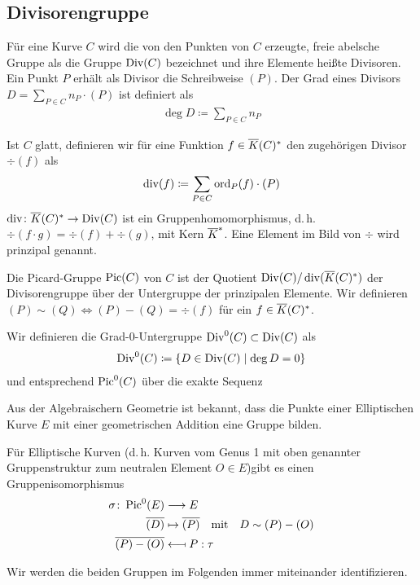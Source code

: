 \subsection{Divisorengruppe}
\begin{Definition}[Divisorengruppe]
  Für eine Kurve $C$ wird die von den Punkten von $C$ erzeugte, freie
  abelsche Gruppe als die Gruppe $\operatorname{Div}(C)$ bezeichnet und ihre
  Elemente heißte Divisoren. Ein Punkt $P$ erhält als Divisor die
  Schreibweise $(P)$. 
  Der Grad eines Divisors $D=\sum_{P\in C}n_P\cdot(P)$ ist definiert als
  \begin{gather*}
    \deg D \coloneqq \sum_{P\in C} n_P
  \end{gather*}
  
  Ist $C$ glatt, definieren wir für eine Funktion
  $f\in\overline K(C)^*$ den zugehörigen Divisor $\div(f)$
  als
  \begin{gather*}
    \operatorname{div}(f) \coloneqq \sum_{P\in C}\operatorname{ord}_P(f)\cdot(P)
  \end{gather*}
  $\operatorname{div}\colon\overline K(C)^*\to\operatorname{Div}(C)$ ist ein Gruppenhomomorphismus,
  d.\,h. $\div(f\cdot g)=\div(f)+\div(g)$,
  mit Kern $\overline K^*$.
  Eine Element im Bild von $\div$ wird prinzipal genannt.
  
  Die Picard-Gruppe $\operatorname{Pic}(C)$ von $C$ ist der Quotient
  $\operatorname{Div}(C)/\operatorname{div}(\overline K(C)^*)$ der Divisorengruppe über der Untergruppe
  der prinzipalen Elemente. Wir definieren 
  $(P)\sim(Q)\Leftrightarrow (P)-(Q)=\div(f)$ für ein $f\in\overline K(C)^*$.

  Wir definieren die Grad-0-Untergruppe $\operatorname{Div}^0(C)\subset\operatorname{Div}(C)$ als
  \begin{gather*}
    \operatorname{Div}^0(C) \coloneqq \left\{ D\in\operatorname{Div}(C) \;\middle|\; \deg D=0 \right\}
  \end{gather*}
  und entsprechend $\operatorname{Pic}^0(C)$ über die exakte Sequenz
  \begin{center}
  \end{center}
\end{Definition}

Aus der Algebraischern Geometrie ist bekannt, dass die Punkte einer
Elliptischen Kurve $E$ mit einer geometrischen Addition eine Gruppe
bilden.

\begin{Satz}
  Für Elliptische Kurven (d.\,h. Kurven vom Genus 1 mit oben genannter
  Gruppenstruktur zum neutralen Element $O\in E$)gibt es einen
  Gruppenisomorphismus
  \begin{align*}
    \sigma\colon \operatorname{Pic}^0(E) &\longrightarrow E\\
    \overline{(D)} &\mapsto \overline{(P)}
                     \quad\text{mit}\quad D\sim (P)-(O)\\
    \overline{(P)-(O)} &\longmapsfrom P : \tau
  \end{align*}
\end{Satz}
Wir werden die beiden Gruppen im Folgenden immer miteinander
identifizieren.

